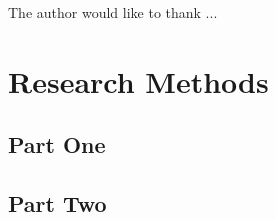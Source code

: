 \documentclass[manuscript,review,screen,nonacm,sigplan]{acmart}
\begin{document}
\begin{acks}
  The author would like to thank ...
\end{acks}





\appendix

\section{Research Methods}

\subsection{Part One}

\subsection{Part Two}
\end{document}

